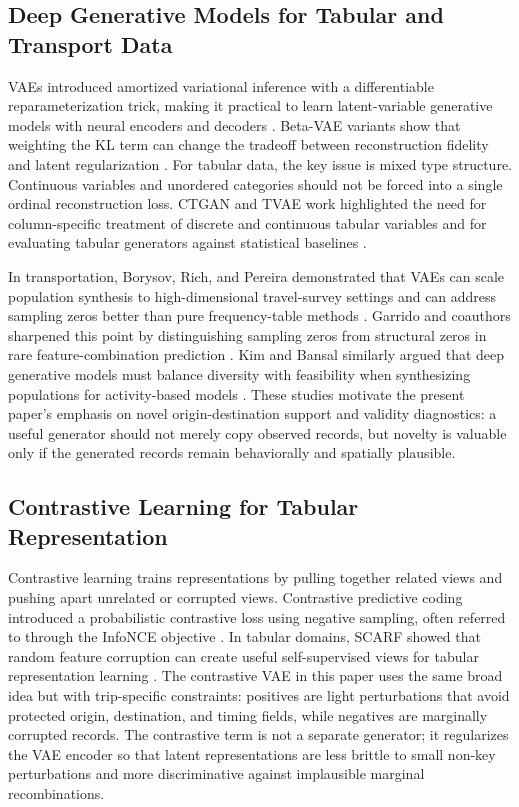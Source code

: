 \documentclass[3p,times,procedia]{elsarticle}
\begin{document}
\subsection{Deep Generative Models for Tabular and Transport Data}
VAEs introduced amortized variational inference with a differentiable reparameterization trick, making it practical to learn latent-variable generative models with neural encoders and decoders \cite{kingma2014autoencoding,rezende2014stochastic}. Beta-VAE variants show that weighting the KL term can change the tradeoff between reconstruction fidelity and latent regularization \cite{higgins2017beta}. For tabular data, the key issue is mixed type structure. Continuous variables and unordered categories should not be forced into a single ordinal reconstruction loss. CTGAN and TVAE work highlighted the need for column-specific treatment of discrete and continuous tabular variables and for evaluating tabular generators against statistical baselines \cite{xu2019modeling}.

In transportation, Borysov, Rich, and Pereira demonstrated that VAEs can scale population synthesis to high-dimensional travel-survey settings and can address sampling zeros better than pure frequency-table methods \cite{borysov2019scalable}. Garrido and coauthors sharpened this point by distinguishing sampling zeros from structural zeros in rare feature-combination prediction \cite{garrido2020prediction}. Kim and Bansal similarly argued that deep generative models must balance diversity with feasibility when synthesizing populations for activity-based models \cite{kim2023deep}. These studies motivate the present paper's emphasis on novel origin-destination support and validity diagnostics: a useful generator should not merely copy observed records, but novelty is valuable only if the generated records remain behaviorally and spatially plausible.

\subsection{Contrastive Learning for Tabular Representation}
Contrastive learning trains representations by pulling together related views and pushing apart unrelated or corrupted views. Contrastive predictive coding introduced a probabilistic contrastive loss using negative sampling, often referred to through the InfoNCE objective \cite{oord2018representation}. In tabular domains, SCARF showed that random feature corruption can create useful self-supervised views for tabular representation learning \cite{bahri2022scarf}. The contrastive VAE in this paper uses the same broad idea but with trip-specific constraints: positives are light perturbations that avoid protected origin, destination, and timing fields, while negatives are marginally corrupted records. The contrastive term is not a separate generator; it regularizes the VAE encoder so that latent representations are less brittle to small non-key perturbations and more discriminative against implausible marginal recombinations.
\end{document}
